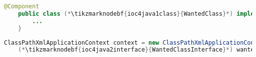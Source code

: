 \example
\begin{lstlisting}[language=Java, title={Wanted class}]
    @Component
    public class (*\tikzmarknodebf{ioc4java1class}{WantedClass}*) implements (*\tikzmarknodebf{ioc4java1interface}{WantedClassInterface}*) {
        ...
    }
\end{lstlisting}
\begin{lstlisting}[language=Java, title={Usage}]
    ClassPathXmlApplicationContext context = new ClassPathXmlApplicationContext("configurationFile.xml");
    (*\tikzmarknodebf{ioc4java2interface}{WantedClassInterface}*) wantedClassInstance = context.getBean("(*\tikzmarknodebf{ioc4java2beanid}{wantedClass}[ForestGreen]*)", (*\tikzmarknodebf{ioc4java2interface2}{WantedClassInterface}*).class);
\end{lstlisting}
